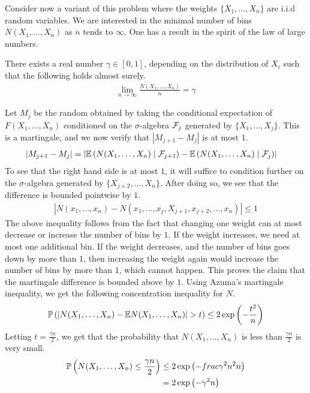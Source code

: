\documentclass[11pt]{article}
\begin{document}
Consider now a variant of this problem where the weights $\{X_1, \ldots, X_n\}$ are i.i.d random variables.
We are interested in the minimal number of bins $N(X_1, \ldots, X_n)$ as $n$ tends to $\infty$.
One has a result in the spirit of the law of large numbers.
\begin{theorem}
  There exists a real number $\gamma \in [0,1]$, depending on the distribution of $X_i$ such that the following holds almost surely.
  \begin{align*}
    \lim_{n \to \infty} \frac{N(X_1, \ldots, X_n)}{n} = \gamma
  \end{align*}
\end{theorem}
  Let $M_j$ be the random obtained by taking the conditional expectation of $F(X_1, \ldots , X_n)$ conditioned on the $\sigma$-algebra $\cF_j$ generated by $\{X_1, \ldots, X_j\}$.
  This is a martingale, and we now verify that $\left| M_{j+1} - M_j \right|$ is at most $1$.
  \begin{align*}
    \left| M_{j+1} - M_j \right|
    &= \left| \E\left( N(X_1, \ldots, X_n) \mid \cF_{j+1} \right) - \E\left( N(X_1, \ldots, X_n) \mid \cF_{j} \right) \right|
  \end{align*}
  To see that the right hand side is at most $1$, it will suffice to condition further on the $\sigma$-algebra generated by $\{ X_{j+2}, \ldots, X_n\}$.
  After doing so, we see that the difference is bounded pointwise by $1$.
  \begin{align*}
    \left| N(x_1, \ldots, x_n) - N(x_1, \ldots, x_j, X_{j+1}, x_{j+2}, \ldots, x_n) \right| \leq 1
  \end{align*}
  The above inequality follows from the fact that changing one weight can at most decrease or increase the number of bins by $1$.
  If the weight increases, we need at most one additional bin.
  If the weight decreases, and the number of bins goes down by more than $1$, then increasing the weight again would increase the number of bins by more than $1$, which cannot happen.
  This proves the claim that the martingale difference is bounded above by $1$.
  Using Azuma's martingale inequality, we get the following concentration inequality for $N$.
  \begin{align*}
    \P\left( \left| N(X_1, \ldots, X_n) - \E N(X_1, \ldots, X_n) \right| > t \right)
    \leq 2 \exp\left( - \frac{t^2}{n} \right)
  \end{align*}
  Letting $t = \frac{\gamma n}{2}$, we get that the probability that $N(X_1, \ldots, X_n)$ is less than $\frac{\gamma n}{2}$ is very small.
  \begin{align*}
    \P\left( N(X_1, \ldots, X_n) \leq \frac{\gamma n}{2} \right) &\leq 2 \exp\left( -frac{\gamma^2 n^2}{n} \right) \\
   &= 2 \exp \left( -\gamma^2 n \right)
  \end{align*}
\end{document}
